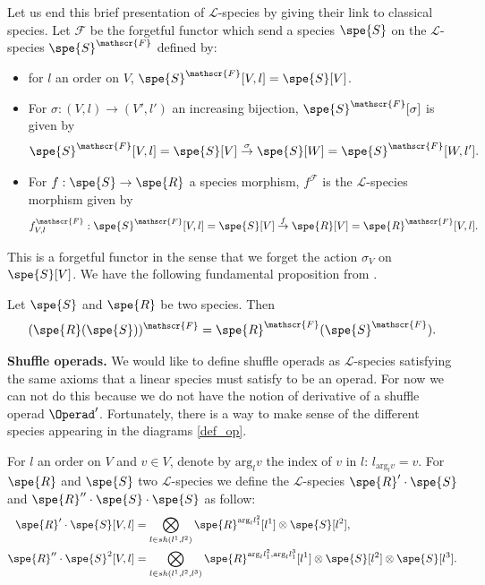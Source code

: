 Let us end this brief presentation of $\mathscr{L}$-species by giving their link to classical species. Let $\mathscr{F}$ be the forgetful functor which send a  
species $\spe{S}$ on the $\mathscr{L}$-species $\spe{S}^{\mathscr{F}}$ defined by:
\begin{itemize}
    \item for $l$ an order on $V$, $\spe{S}^{\mathscr{F}}[V,l]=\spe{S}[V]$. 
    \item For $\sigma:(V,l)\to (V',l')$ an increasing bijection, $\spe{S}^{\mathscr{F}}[\sigma]$ is given by
    \begin{equation}
        \spe{S}^{\mathscr{F}}[V,l]=\spe{S}[V] \stackrel{\sigma}{\to} \spe{S}[W]= \spe{S}^{\mathscr{F}}[W,l'].
    \end{equation}
    \item For $f:\spe{S}\to\spe{R}$ a species morphism, $f^{\mathscr{F}}$ is the $\mathscr{L}$-species morphism given by
        \begin{equation}
        f^{\mathscr{F}}_{V,l}:\spe{S}^{\mathscr{F}}[V,l]= \spe{S}[V] \stackrel{f}{\to} \spe{R}[V]= \spe{R}^{\mathscr{F}}[V,l].
    \end{equation}
\end{itemize}
This is a forgetful functor in the sense that we forget the action $\sigma_V$ on $\spe{S}[V]$. We have the following fundamental proposition from
\cite{DK10}.

\begin{prop}[{\cite[Proposition 3]{DK10}}]\label{prop_dk10}
    Let $\spe{S}$ and $\spe{R}$ be two species. Then 
    \begin{equation}
        (\spe{R}(\spe{S}))^{\mathscr{F}}=\spe{R}^\mathscr{F}(\spe{S}^\mathscr{F}).
    \end{equation}
\end{prop}


\noindent\textbf{Shuffle operads.} We would like to define shuffle operads as $\mathscr{L}$-species satisfying the same axioms that a linear species must satisfy to be an operad. For now we can
not do this because we do not have the notion of derivative of a shuffle operad $\Operad'$. Fortunately, there is a way to make sense of the different 
species appearing in the diagrams \eqref{def_op}. 

For $l$ an order on $V$ and $v\in V$, denote by $\text{arg}_lv$ the index of $v$ in $l$: $l_{\text{arg}_lv}=v$. 
For $\spe{R}$ and $\spe{S}$ two $\mathscr{L}$-species we define the $\mathscr{L}$-species $\spe{R}'\cdot\spe{S}$ and $\spe{R}''\cdot\spe{S}\cdot\spe{S}$ as follow:
\begin{equation}\begin{split}
    \spe{R}'\cdot\spe{S}[V,l] &= \bigotimes_{l\in sh(l^1,l^2)} \spe{R}^{\text{arg}_l l_1^2}[l^1]\otimes\spe{S}[l^2], \\
    \spe{R}''\cdot\spe{S}^2[V,l] &= \bigotimes_{l\in sh(l^1,l^2,l^3)} \spe{R}^{\text{arg}_l l^2_1, \text{arg}_l l^3_1}[l^1]\otimes\spe{S}[l^2]\otimes\spe{S}[l^3].
\end{split}\end{equation}

